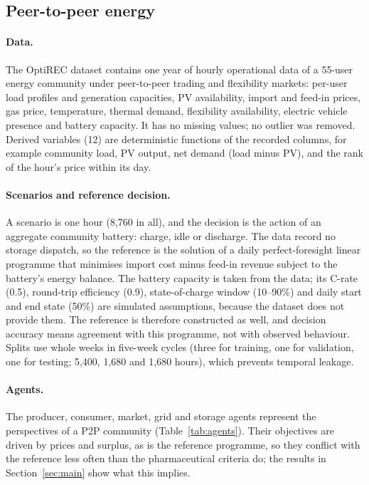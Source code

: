 \documentclass[pdflatex,sn-basic]{sn-jnl}
\begin{document}
\subsection{Peer-to-peer energy}\label{sec:energy}

\paragraph{Data.} The OptiREC dataset \citep{optirecdata2025,garciamunoz2025} contains one
year of hourly operational data of a 55-user energy community under peer-to-peer trading and
flexibility markets: per-user load profiles and generation capacities, PV availability, import and
feed-in prices, gas price, temperature, thermal demand, flexibility availability, electric
vehicle presence and battery capacity. It has no missing values; no outlier was removed.
Derived variables (12) are deterministic functions of the recorded columns, for example
community load, PV output, net demand (load minus PV), and the rank of the hour's price within
its day.

\paragraph{Scenarios and reference decision.} A scenario is one hour (8{,}760 in all), and the
decision is the action of an aggregate community battery: charge, idle or discharge. The data
record no storage dispatch, so the reference is the solution of a daily perfect-foresight
linear programme that minimises import cost minus feed-in revenue subject to the battery's
energy balance. The battery capacity is taken from the data; its C-rate (0.5), round-trip
efficiency (0.9), state-of-charge window (10--90\%) and daily start and end state (50\%) are
simulated assumptions, because the dataset does not provide them. The reference is therefore
constructed as well, and decision accuracy means agreement with this programme, not with
observed behaviour. Splits use whole weeks in five-week cycles (three for training, one for
validation, one for testing; 5{,}400, 1{,}680 and 1{,}680 hours), which prevents temporal
leakage.

\paragraph{Agents.} The producer, consumer, market, grid and storage agents represent the
perspectives of a P2P community (Table~\ref{tab:agents}). Their objectives are driven by
prices and surplus, as is the reference programme, so they conflict with the reference less
often than the pharmaceutical criteria do; the results in Section~\ref{sec:main} show what
this implies.
\end{document}
